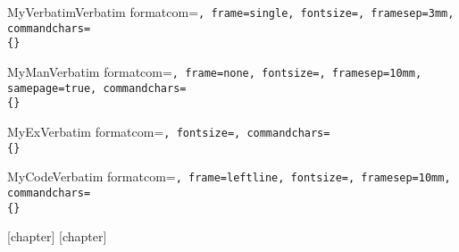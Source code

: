 



\newcommand{\commandline}[1]{{\latintext\tt #1}}
\newcommand{\commandinput}[1]{{\textcolor{blue}{#1}}}

\newcommand{\myleftarrow}{\Pisymbol{psy}{172}}
\newcommand{\myenter}{\Pisymbol{psy}{191}}
\newcommand{\cin}[1]{{\latintext\tt \textcolor{blue}{#1}}\myenter}


\DefineVerbatimEnvironment%
 {MyVerbatim}{Verbatim}
 {formatcom=\latintext\tt,
  frame=single,
  fontsize=\scriptsize,
  framesep=3mm,
  commandchars=\\\{\}}



\DefineVerbatimEnvironment%
 {MyMan}{Verbatim}
 {formatcom=\latintext\tt,
  frame=none,
  fontsize=\scriptsize,
  framesep=10mm,
  samepage=true,
  commandchars=\\\{\}}

\DefineVerbatimEnvironment%
 {MyEx}{Verbatim}
 {formatcom=\latintext\tt,
  fontsize=\scriptsize,
  commandchars=\\\{\}}

\DefineVerbatimEnvironment%
 {MyCode}{Verbatim}
 {formatcom=\latintext\tt,
  frame=leftline,
  fontsize=\scriptsize,
  framesep=10mm,
  commandchars=\\\{\}}

[chapter]
\renewcommand{\themyprac}{\arabic{chapter}.\arabic{myprac}}
[chapter]
\renewcommand{\themyexample}{\arabic{chapter}.\arabic{myexample}}



